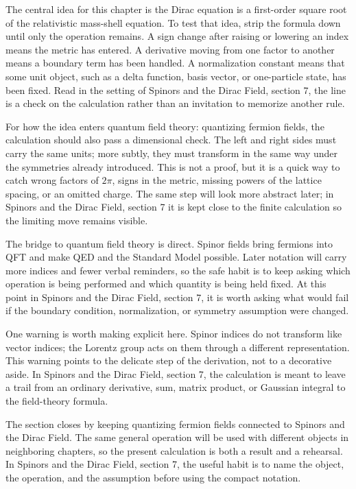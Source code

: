 The central idea for this chapter is the Dirac equation is a first-order square root of the relativistic mass-shell equation.  To test that idea, strip the formula down until only the operation remains.  A sign change after raising or lowering an index means the metric has entered.  A derivative moving from one factor to another means a boundary term has been handled.  A normalization constant means that some unit object, such as a delta function, basis vector, or one-particle state, has been fixed.  Read in the setting of Spinors and the Dirac Field, section 7, the line is a check on the calculation rather than an invitation to memorize another rule.

For how the idea enters quantum field theory: quantizing fermion fields, the calculation should also pass a dimensional check.  The left and right sides must carry the same units; more subtly, they must transform in the same way under the symmetries already introduced.  This is not a proof, but it is a quick way to catch wrong factors of \(2\pi\), signs in the metric, missing powers of the lattice spacing, or an omitted charge.  The same step will look more abstract later; in Spinors and the Dirac Field, section 7 it is kept close to the finite calculation so the limiting move remains visible.

The bridge to quantum field theory is direct.  Spinor fields bring fermions into QFT and make QED and the Standard Model possible.  Later notation will carry more indices and fewer verbal reminders, so the safe habit is to keep asking which operation is being performed and which quantity is being held fixed.  At this point in Spinors and the Dirac Field, section 7, it is worth asking what would fail if the boundary condition, normalization, or symmetry assumption were changed.

One warning is worth making explicit here.  Spinor indices do not transform like vector indices; the Lorentz group acts on them through a different representation.  This warning points to the delicate step of the derivation, not to a decorative aside.  In Spinors and the Dirac Field, section 7, the calculation is meant to leave a trail from an ordinary derivative, sum, matrix product, or Gaussian integral to the field-theory formula.

The section closes by keeping quantizing fermion fields connected to Spinors and the Dirac Field.  The same general operation will be used with different objects in neighboring chapters, so the present calculation is both a result and a rehearsal.  In Spinors and the Dirac Field, section 7, the useful habit is to name the object, the operation, and the assumption before using the compact notation.



